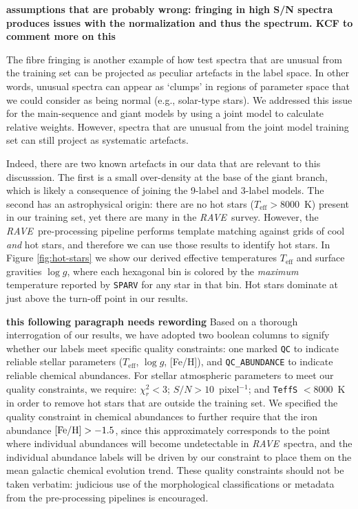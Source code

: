 \documentclass[preprint,trackchanges]{aastex}
\newcommand{\acronym}[1]{{\small{#1}}}
\newcommand{\project}[1]{\textsl{#1}}
\newcommand{\rave}{\project{\acronym{RAVE}}}
\newcommand{\stub}[1]{{\color{blue} \textbf{#1}}}
\newcommand{\teff}{T_{\mathrm{eff}}}
\newcommand{\logg}{\log g}
\begin{document}
\stub{assumptions that are probably wrong: fringing in high S/N spectra produces issues with the normalization and thus the spectrum. KCF to comment more on this}


The fibre fringing is another example of how test spectra that are
unusual from the training set can be projected as peculiar artefacts in the
label space.  In other words, unusual spectra can appear as `clumps' in
regions of parameter space that we could consider as being normal 
(e.g., solar-type stars).  We addressed this issue for the main-sequence
and giant models by using a joint model to calculate relative weights.
However, spectra that are unusual from the joint model training set can
still project as systematic artefacts.  


Indeed, there are two known artefacts in our data that are relevant to this discusssion. The
first is a small over-density at the base of the giant branch, which is
likely a consequence of joining the 9-label and 3-label models.  The
second has an astrophysical origin: there are no hot stars ($\teff > 8000$~K)
present in our training set, yet there are many in the \rave\ survey.
However, the \rave\ pre-processing pipeline \citep[\texttt{SPARV};][]{Steinmetz_2006,Zwitter_2008} performs
template matching against grids of cool \emph{and} hot stars, and therefore
we can use those results to identify hot stars. In Figure \ref{fig:hot-stars} 
we show our derived effective temperatures $\teff$ and surface gravities $\logg$,
where each hexagonal bin is colored by the \emph{maximum} temperature
reported by \texttt{SPARV} for any star in that bin.  Hot stars dominate
at just above the turn-off point in our results. 


\stub{this following paragraph needs rewording}
Based on a thorough interrogation of our results, we have adopted two boolean
columns to signify whether our labels meet specific quality constraints:
one marked \texttt{QC} to indicate reliable stellar parameters ($\teff$, $\logg$, [Fe/H]), and \texttt{QC\_ABUNDANCE} to indicate reliable chemical abundances.
For stellar atmospheric parameters to meet our quality constraints, we
require: $\chi_r^2 < 3$; $S/N >10$~pixel$^{-1}$; and \texttt{TeffS} $< 8000$~K
in order to remove hot stars that are outside the training set.  We
specified the quality constraint in chemical abundances to further
require that the iron abundance $[{\rm Fe/H}] > -1.5$, since this approximately
corresponds to the point where individual abundances will become undetectable
in \rave\ spectra, and the individual abundance labels will be driven by our
constraint to place them on the mean galactic chemical evolution trend.
These quality constraints should not be taken verbatim: judicious use of
the morphological classifications \citep{Matijevic_2012} or metadata from
the pre-processing pipelines is encouraged.
\end{document}
